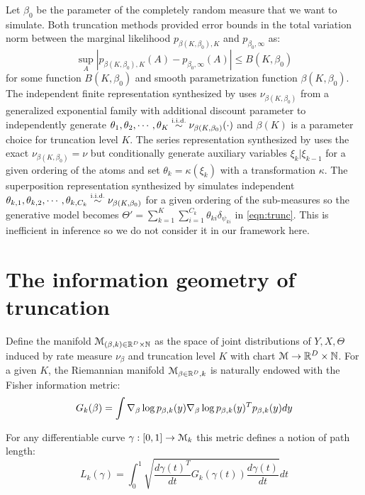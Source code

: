 \documentclass[letterpaper]{article}
\begin{document}
Let $\beta_0$ be the parameter of the completely random measure that we want to simulate. Both truncation methods provided error bounds in the total variation norm between the marginal likelihood $p_{\beta(K,\beta_0),K}$ and $p_{\beta_0,\infty}$ as:
\[
	\sup_A\left|p_{\beta(K,\beta_0),K}(A)-p_{\beta_0,\infty}(A)\right|\le B(K,\beta_0)
\]
for some function $B(K,\beta_0)$ and smooth parametrization function $\beta(K,\beta_0)$. The independent finite representation synthesized by \cite{nguyen20} uses $\nu_{\beta(K,\beta_0)}$ from a generalized exponential family \cite{broderick18} with additional discount parameter to independently generate $\theta_1,\theta_2,\cdots,\theta_K\distiid\nu_{\beta(K,\beta_0)}(\cdot)$ and $\beta(K)$ is a parameter choice for truncation level  $K$. The series representation synthesized by \cite{campbell19} uses the exact $\nu_{\beta(K,\beta_0)}=\nu$ but conditionally generate auxiliary variables $\xi_k|\xi_{k-1}$ for a given ordering of the atoms and set $\theta_k=\kappa(\xi_k)$ with a transformation $\kappa$. The superposition representation synthesized by \cite{campbell19} simulates independent $\theta_{k,1},\theta_{k,2},\cdots,\theta_{k,C_k}\distiid\nu_{\beta(K,\beta_0)}$ for a given ordering of the sub-measures so the generative model becomes $\Theta'=\sum_{k=1}^K\sum_{i=1}^{C_k}\theta_{ki}\delta_{\psi_{ki}}$ in \ref{eqn:trunc}. This is inefficient in inference \cite{zhu20,nguyen20} so we do not consider it in our framework here. 

\section{The information geometry of truncation}

Define the manifold $\mathcal{M}_{(\beta,k)\in\mathbb{R}^D\times\mathbb{N}}$ as the space of  joint distributions of $Y,X,\Theta$ induced by rate measure $\nu_\beta$ and truncation level $K$ with chart $\mathcal{M}\rightarrow\mathbb{R}^D\times\mathbb{N}$.  For a given $K$, the Riemannian manifold $\mathcal{M}_{\beta\in\mathbb{R}^D,k}$ is naturally endowed with the Fisher information metric:
\[
	G_k(\beta)=\int\nabla_\beta\log p_{\beta,k}(y)\nabla_\beta\log p_{\beta,k}(y)^Tp_{\beta,k}(y)dy
\]

For any differentiable curve $\gamma:[0,1]\rightarrow\mathcal{M}_k$ this metric defines a notion of path length:
\[
	L_k(\gamma)=\int_0^1\sqrt{\frac{d\gamma(t)^T}{dt}G_k(\gamma(t))\frac{d\gamma(t)}{dt}}dt
\]



{
\small


}
\end{document}
